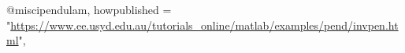 @misc{ipendulam,
  howpublished = "\url{https://www.ee.usyd.edu.au/tutorials_online/matlab/examples/pend/invpen.html}",
}